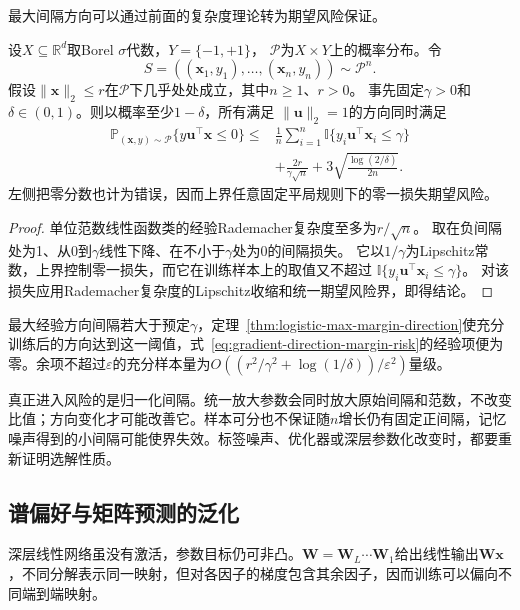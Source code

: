 最大间隔方向可以通过前面的复杂度理论转为期望风险保证。
\begin{theorem}[基于最大间隔的分类期望风险]
\label{thm:max-margin-classification-risk}
设$X\subseteq\mathbb R^d$取Borel $\sigma$代数，$Y=\{-1,+1\}$，
$\mathcal P$为$X\times Y$上的概率分布。令
\[
 S=((\bm x_1,y_1),\ldots,(\bm x_n,y_n))\sim\mathcal P^n.
\]
假设$\|\bm x\|_2\leq r$在$\mathcal P$下几乎处处成立，其中$n\geq1$、$r>0$。
事先固定$\gamma>0$和$\delta\in(0,1)$。则以概率至少$1-\delta$，所有满足
$\|\bm u\|_2=1$的方向同时满足
\begin{equation}
 \begin{aligned}
 \mathbb P_{(\bm x,y)\sim\mathcal P}\{y\bm u^\top\bm x\leq0\}
 \leq{}&\frac1n\sum_{i=1}^n
       \mathbb I\{y_i\bm u^\top\bm x_i\leq\gamma\}\\
 &+\frac{2r}{\gamma\sqrt n}
       +3\sqrt{\frac{\log(2/\delta)}{2n}}.
 \end{aligned}
 \label{eq:gradient-direction-margin-risk}
\end{equation}
左侧把零分数也计为错误，因而上界任意固定平局规则下的零一损失期望风险。
\end{theorem}
\begin{proof}
单位范数线性函数类的经验Rademacher复杂度至多为$r/\sqrt n$。
取在负间隔处为1、从0到$\gamma$线性下降、在不小于$\gamma$处为0的间隔损失。
它以$1/\gamma$为Lipschitz常数，上界控制零一损失，而它在训练样本上的取值又不超过
$\mathbb I\{y_i\bm u^\top\bm x_i\leq\gamma\}$。
对该损失应用Rademacher复杂度的Lipschitz收缩和统一期望风险界，即得结论。
\end{proof}

最大经验方向间隔若大于预定$\gamma$，定理~\ref{thm:logistic-max-margin-direction}使充分训练后的方向达到这一阈值，式~\eqref{eq:gradient-direction-margin-risk}的经验项便为零。余项不超过$\varepsilon$的充分样本量为$O((r^2/\gamma^2+\log(1/\delta))/\varepsilon^2)$量级。

真正进入风险的是归一化间隔。统一放大参数会同时放大原始间隔和范数，不改变比值；方向变化才可能改善它。样本可分也不保证随$n$增长仍有固定正间隔，记忆噪声得到的小间隔可能使界失效。标签噪声、优化器或深层参数化改变时，都要重新证明选解性质。

\subsection{谱偏好与矩阵预测的泛化}

深层线性网络虽没有激活，参数目标仍可非凸。$\bm W=\bm W_L\cdots\bm W_1$给出线性输出$\bm W\bm x$，不同分解表示同一映射，但对各因子的梯度包含其余因子，因而训练可以偏向不同端到端映射。

